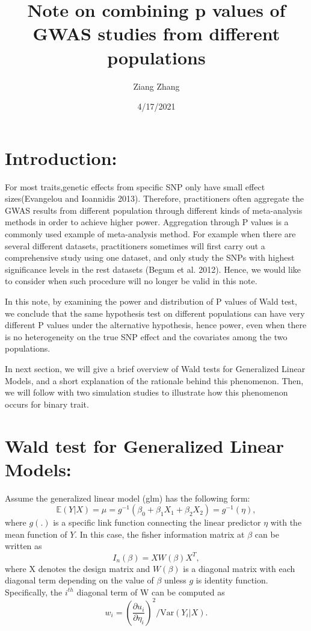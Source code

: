 \documentclass[
]{article}
\title{\textbf{Note on combining p values of GWAS studies from different
populations}}
\author{Ziang Zhang}
\date{4/17/2021}
\begin{document}
\maketitle

\newcommand{\p}{\text{P}}
\newcommand{\E}{\mathbb{E}}
\newcommand{\Var}{\text{Var}}

\hypertarget{introduction}{%
\section{Introduction:}\label{introduction}}

For most traits,genetic effects from specific SNP only have small effect
sizes(Evangelou and Ioannidis 2013). Therefore, practitioners often
aggregate the GWAS results from different population through different
kinds of meta-analysis methods in order to achieve higher power.
Aggregation through P values is a commonly used example of meta-analysis
method. For example when there are several different datasets,
practitioners sometimes will first carry out a comprehensive study using
one dataset, and only study the SNPs with highest significance levels in
the rest datasets (Begum et al. 2012). Hence, we would like to consider
when such procedure will no longer be valid in this note.

In this note, by examining the power and distribution of P values of
Wald test, we conclude that the same hypothesis test on different
populations can have very different P values under the alternative
hypothesis, hence power, even when there is no heterogeneity on the true
SNP effect and the covariates among the two populations.

In next section, we will give a brief overview of Wald tests for
Generalized Linear Models, and a short explanation of the rationale
behind this phenomenon. Then, we will follow with two simulation studies
to illustrate how this phenomenon occurs for binary trait.

\hypertarget{wald-test-for-generalized-linear-models}{%
\section{Wald test for Generalized Linear
Models:}\label{wald-test-for-generalized-linear-models}}

Assume the generalized linear model (glm) has the following form:
\[\mathbb{E}(Y|X) = \mu = g^{-1}(\beta_0 + \beta_1 X_1 + \beta_2X_2) = g^{-1}(\eta),\]
where \(g(.)\) is a specific link function connecting the linear
predictor \(\eta\) with the mean function of \(Y\). In this case, the
fisher information matrix at \(\beta\) can be written as
\[I_n(\beta) = XW(\beta) X^T,\] where X denotes the design matrix and
\(W(\beta)\) is a diagonal matrix with each diagonal term depending on
the value of \(\beta\) unless \(g\) is identity function. Specifically,
the \(i^{th}\) diagonal term of W can be computed as
\[w_i=(\frac{\partial u_i}{\partial\eta_i})^2/\text{Var}(Y_i|X).\]
\end{document}

